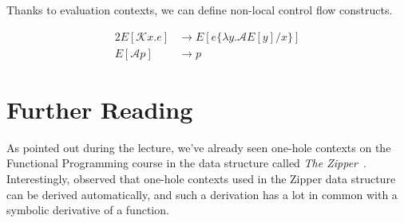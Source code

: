 Thanks to evaluation contexts, we can define non-local control flow constructs.

\begin{alignat*}{2}
  E[\mathcal{K} x.e] & \longrightarrow E[e\{\lambda y.\mathcal{A} E[y] / x\}] \\
  E[\mathcal{A} p]   & \longrightarrow p
\end{alignat*}

\section{Further Reading}

As pointed out during the lecture, we've already seen one-hole contexts
on the Functional Programming course
in the data structure called \emph{The Zipper}~\citep{Huet97}.
Interestingly, \citet{McBride} observed that one-hole contexts used
in the Zipper data structure can be derived automatically,
and such a derivation has a lot in common with
a symbolic derivative of a function.
